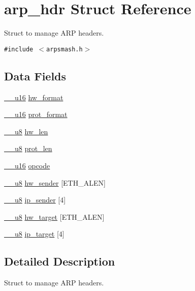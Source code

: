 \hypertarget{structarp__hdr}{
\section{arp\_\-hdr Struct Reference}
\label{structarp__hdr}
}
Struct to manage ARP headers.  


{\tt \#include $<$arpsmash.h$>$}

\subsection*{Data Fields}
\begin{CompactItemize}
\item 
\hyperlink{arpsmash_8h_c915988d8c60a3b943f936c25f9eca6e}{\_\-\_\-u16} \hyperlink{structarp__hdr_c07cef0a4424ce12823ee9d1e0e87db3}{hw\_\-format}
\item 
\hyperlink{arpsmash_8h_c915988d8c60a3b943f936c25f9eca6e}{\_\-\_\-u16} \hyperlink{structarp__hdr_bfad2a4a302d6cf9e90cf24cfb7083aa}{prot\_\-format}
\item 
\hyperlink{arpsmash_8h_b291f552d5fd4d65ac668d6b2b180919}{\_\-\_\-u8} \hyperlink{structarp__hdr_a2dab6f1ec73220dce15d8d7ad2e2849}{hw\_\-len}
\item 
\hyperlink{arpsmash_8h_b291f552d5fd4d65ac668d6b2b180919}{\_\-\_\-u8} \hyperlink{structarp__hdr_5c0f4a34be166f1014c8bcfb29c61f54}{prot\_\-len}
\item 
\hyperlink{arpsmash_8h_c915988d8c60a3b943f936c25f9eca6e}{\_\-\_\-u16} \hyperlink{structarp__hdr_147024074ad8d030bea2f009bd3b5ae2}{opcode}
\item 
\hyperlink{arpsmash_8h_b291f552d5fd4d65ac668d6b2b180919}{\_\-\_\-u8} \hyperlink{structarp__hdr_2216ff9db997f4f12cc35583f7ee783b}{hw\_\-sender} \mbox{[}ETH\_\-ALEN\mbox{]}
\item 
\hyperlink{arpsmash_8h_b291f552d5fd4d65ac668d6b2b180919}{\_\-\_\-u8} \hyperlink{structarp__hdr_4c9e5dd5d08a13b5e539159524ac9eb1}{ip\_\-sender} \mbox{[}4\mbox{]}
\item 
\hyperlink{arpsmash_8h_b291f552d5fd4d65ac668d6b2b180919}{\_\-\_\-u8} \hyperlink{structarp__hdr_77314b08c95679f9ac5436b05d0cdd2b}{hw\_\-target} \mbox{[}ETH\_\-ALEN\mbox{]}
\item 
\hyperlink{arpsmash_8h_b291f552d5fd4d65ac668d6b2b180919}{\_\-\_\-u8} \hyperlink{structarp__hdr_d02fd53a22a4b462103130db81848458}{ip\_\-target} \mbox{[}4\mbox{]}
\end{CompactItemize}


\subsection{Detailed Description}
Struct to manage ARP headers. 

